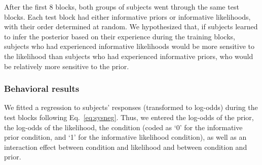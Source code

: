 After the first 8 blocks, both groups of subjects went through the same test blocks. Each test block had either informative priors or informative likelihoods, with their order determined at random. We hypothesized that, if subjects learned to infer the posterior based on their experience during the training blocks, subjects who had experienced informative likelihoods would be more sensitive to the likelihood than subjects who had experienced informative priors, who would be relatively more sensitive to the prior. 

\subsubsection{Behavioral results}


We fitted a regression to subjects' responses (transformed to log-odds) during the test blocks following Eq.~\ref{eq:sysneg}. Thus, we entered the log-odds of the prior, the log-odds of the likelihood, the condition (coded as `0' for the informative prior condition, and `1' for the informative likelihood condition), as well as an interaction effect between condition and likelihood and between condition and prior. 

